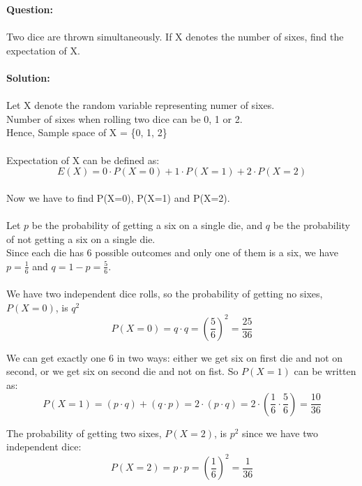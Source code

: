\documentclass[journal,12pt,twocolumn]{IEEEtran}
\begin{document}
\maketitle
\newpage

\bigskip
\renewcommand{\thefigure}{\theenumi}
\renewcommand{\thetable}{\theenumi}

\noindent\textbf{Question:}
\\ \\
Two dice are thrown simultaneously. If X denotes the number of sixes, find the expectation of X.
\\ \\
\noindent\textbf{Solution:}
\\ \\
Let X denote the random variable representing numer of sixes.
\\
Number of sixes when rolling two dice can be 0, 1 or 2.
\\

\noindent Hence, Sample space of X = \{0, 1, 2\} 
\\ \\
Expectation of X can be defined as:
\[ E(X) = 0 \cdot P(X=0) + 1 \cdot P(X=1) + 2 \cdot P(X=2)\]
\\
Now we have to find P(X=0), P(X=1) and P(X=2).
\\ \\
\noindent Let $p$ be the probability of getting a six on a single die, and $q$ be the probability of not getting a six on a single die.
\\
\noindent Since each die has 6 possible outcomes and only one of them is a six, we have $p = \frac{1}{6}$ and $q = 1 - p = \frac{5}{6}$.
\\ \\
\noindent We have two independent dice rolls, so the probability of getting no sixes, $P(X = 0)$, is $q^2$
\[ P(X = 0) = q \cdot q =  \left(\frac{5}{6}\right)^2 = \frac{25}{36} \]

\noindent We can get exactly one 6 in two ways: either we get six on first die and not on second, or we get six on second die and not on fist. So $P(X = 1)$ can be written as:
\[ P(X = 1) = (p \cdot q) + (q \cdot p) = 2 \cdot (p \cdot q) = 2 \cdot \left(\frac{1}{6} \cdot \frac{5}{6}\right) = \frac{10}{36} \]

\noindent The probability of getting two sixes, $P(X = 2)$, is $p^2$ since we have two independent dice:
\[ P(X = 2) = p \cdot p = \left(\frac{1}{6}\right)^2 = \frac{1}{36} \]
\end{document}
